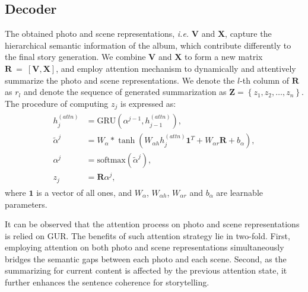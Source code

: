 \documentclass[letterpaper]{article} \usepackage{aaai19}  \usepackage{times}  \usepackage{helvet}  \usepackage{courier}  \usepackage{url}  \usepackage{graphicx}  \usepackage{color}
\begin{document}
\subsection{Decoder}
The obtained  photo and scene representations, \textit{i.e.} $\mathbf{V}$ and $\mathbf{X}$, capture the hierarchical semantic information of the album, which contribute differently to the final story generation.
We combine $\mathbf{V}$ and $\mathbf{X}$ to form a new matrix $\mathbf{R}~=~\left[\mathbf{V}, \mathbf{X}\right]$, and employ attention mechanism to dynamically and attentively summarize the photo and scene representations. We denote the $l$-th column of $\mathbf{R}$ as $r_l$ and denote the sequence of generated summarization as  $\mathbf{Z} = \left\{z_1,z_2,\dots,z_n\right\}$. The procedure of computing  $z_j$ is expressed as:
\begin{align}
	\label{eq:selector_2}
	\begin{split}
		 h_j^{(attn)} &= \text{GRU}\left(\alpha^{j-1}, h_{j-1}^{(attn)}\right), \\
        \tilde{\alpha}^j &= W_\alpha*\tanh\left(W_{\alpha h} h_j^{(attn)} \mathbf{1}^T + W_{\alpha r}\mathbf{R} + b_\alpha\right), \\
        \alpha^j &= \text{softmax} \left( \tilde{\alpha}^j \right), \\
        z_j &= \mathbf{R}\alpha^j,
	\end{split}
\end{align}
where $\mathbf{1}$ is a vector of all ones, and $W_\alpha$, $W_{\alpha h}$, $W_{\alpha r}$ and $b_\alpha$ are learnable parameters.





It can be observed that the attention process on photo and scene representations is relied on GUR. The benefits of such attention strategy lie in two-fold. First, employing attention on both photo and scene representations simultaneously bridges the semantic gaps between each photo and each scene. Second, as the summarizing for current content is affected by the previous attention state, it further enhances the sentence coherence for storytelling.
\end{document}
